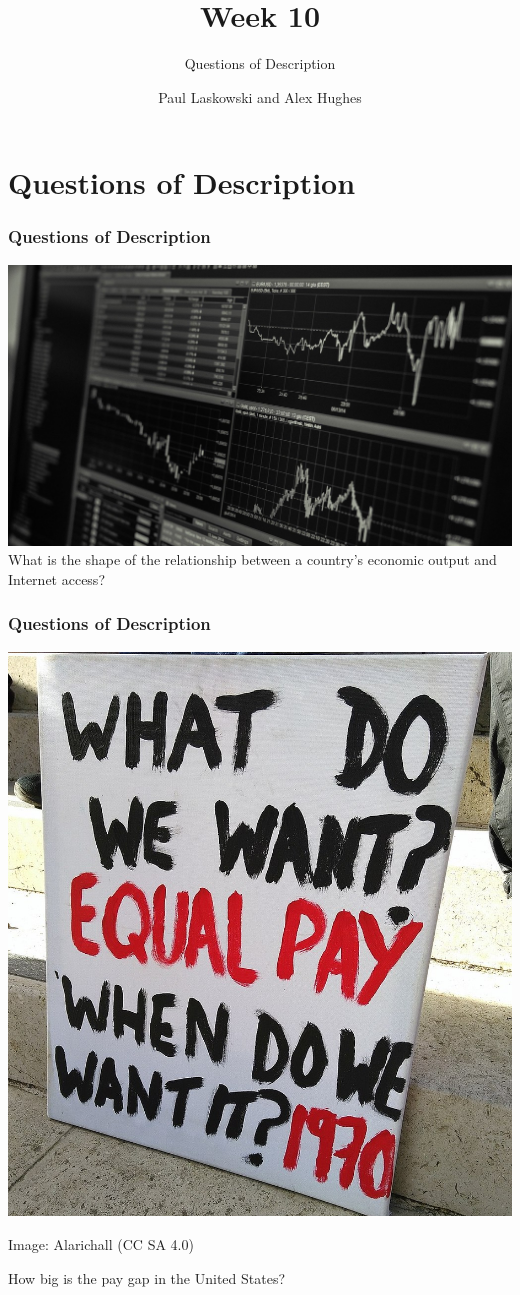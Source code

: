 \documentclass[12pt, block=fill]{beamer}
\title{Week 10}
\subtitle{Questions of Description}
\author{Paul Laskowski and Alex Hughes}
\institute{UC Berkeley, School of Information}
\begin{document}
\begin{frame}
  \maketitle
\end{frame}

\section{Questions of Description}

\begin{frame}

  \frametitle{Questions of Description}
    \includegraphics[width = \textwidth]{images/gdp}
    What is the shape of the relationship between a country's
    economic output and Internet access?
\end{frame}

\begin{frame}
  \frametitle{Questions of Description}
   \begin{center} \includegraphics[width = .5\textwidth]{images/equal_pay}
    
  \vspace{-.8cm} \footnotesize Image: Alarichall (CC SA 4.0)
   \end{center}
   
    How big is the pay gap in the United States? 
\end{frame}
\end{document}
